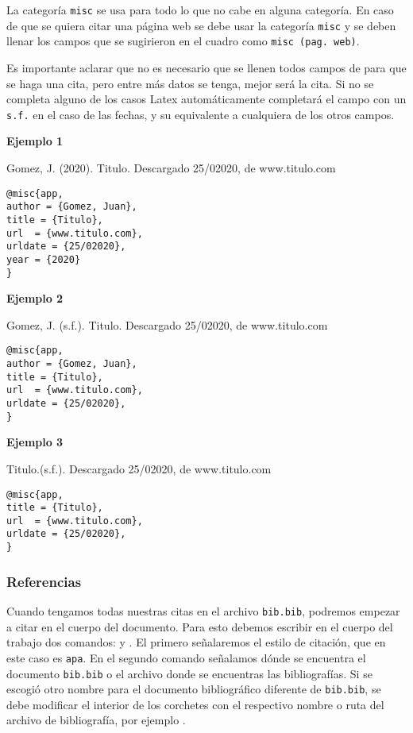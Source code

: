	La categoría \texttt{misc} se usa para todo lo que no cabe en alguna categoría. En caso de que se quiera citar una página web se debe usar la categoría \texttt{misc} y se deben llenar los campos que se sugirieron en el cuadro como \texttt{misc (pag. web)}.
	
	Es importante aclarar que no es necesario que se llenen todos campos de para que se haga una cita, pero entre más datos se tenga, mejor será la cita. Si no se completa alguno de los casos Latex automáticamente completará el campo con un \texttt{s.f.} en el caso de las fechas, y su equivalente a cualquiera de los otros campos.
	
	\textbf{Ejemplo 1}
	
	Gomez, J. (2020). Titulo. Descargado 25/02020, de www.titulo.com	
		\begin{myquote}
			\begin{lstlisting}
@misc{app,
author = {Gomez, Juan},
title = {Titulo},
url  = {www.titulo.com},
urldate = {25/02020},
year = {2020}
}
			\end{lstlisting}
		\end{myquote}
	
	\textbf{Ejemplo 2}
	
	Gomez, J. (s.f.). Titulo. Descargado 25/02020, de www.titulo.com	
	\begin{myquote}
		\begin{lstlisting}
@misc{app,
author = {Gomez, Juan},
title = {Titulo},
url  = {www.titulo.com},
urldate = {25/02020},
}
		\end{lstlisting}
	\end{myquote}
	
	\textbf{Ejemplo 3}
	
	Titulo.(s.f.). Descargado 25/02020, de www.titulo.com	
	\begin{myquote}
		\begin{lstlisting}
@misc{app,
title = {Titulo},
url  = {www.titulo.com},
urldate = {25/02020},
}
		\end{lstlisting}
	\end{myquote}

	\subsubsection{Referencias}
	
	Cuando tengamos todas nuestras citas en el archivo \texttt{bib.bib}, podremos empezar a citar en el cuerpo del documento. Para esto debemos escribir en el cuerpo del trabajo dos comandos: \verb|| y  \verb||. El primero señalaremos el estilo de citación, que en este caso es \texttt{apa}. En el segundo comando señalamos dónde se encuentra el documento \texttt{bib.bib} o el archivo donde se encuentras las bibliografías. Si se escogió otro nombre para el documento bibliográfico diferente de \texttt{bib.bib}, se debe modificar el interior de los corchetes con el respectivo nombre o ruta del archivo de bibliografía, por ejemplo \verb||.
	
